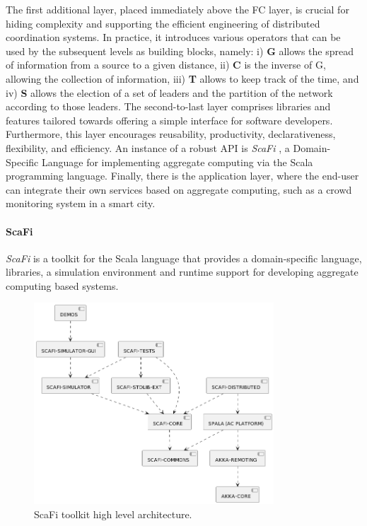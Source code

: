 \documentclass[12pt,a4paper,openright,twoside]{book}
\begin{document}
The first additional layer, placed immediately above the FC layer, is crucial for hiding complexity and supporting the 
    efficient engineering of distributed coordination systems. In practice, it introduces various operators that can 
    be used by the subsequent levels as building blocks, namely:
    i) \textbf{G} allows the spread of information from a source to a given distance,
    ii) \textbf{C} is the inverse of G, allowing the collection of information,
    iii) \textbf{T} allows to keep track of the time, and
    iv) \textbf{S} allows the election of a set of leaders and the partition of the network according to those leaders. 
The second-to-last layer comprises libraries and features tailored towards offering a simple interface for 
    software developers. Furthermore, this layer encourages reusability, productivity, declarativeness, 
    flexibility, and efficiency. An instance of a robust API is \emph{ScaFi} \cite{casadei2022scafi}, a Domain-Specific 
    Language for implementing aggregate computing via the Scala programming language.
Finally, there is the application layer, where the end-user can integrate their own services based on aggregate computing, 
    such as a crowd monitoring system in a smart city.

\paragraph{ScaFi}
\emph{ScaFi} \cite{casadei2022scafi} is a toolkit for the Scala language that provides a domain-specific language, libraries, 
    a simulation environment and runtime support for developing aggregate computing based systems.

\begin{figure}[t]
    \centering
    \includegraphics[width=0.8\textwidth]{figures/scafi-arc.png}
    \caption{ScaFi toolkit high level architecture.}
    \label{fig:scafi-arc}
\end{figure}
\end{document}
